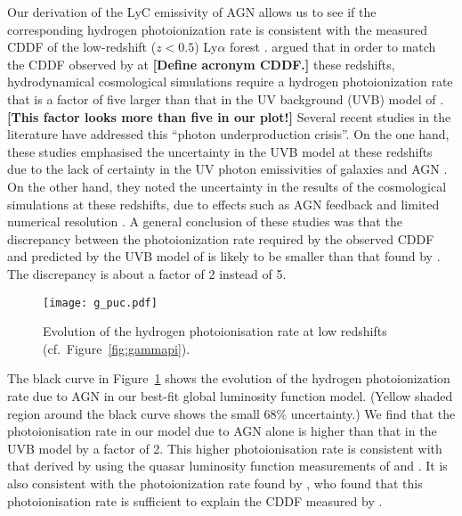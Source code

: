 \documentclass[a4paper,fleqn,usenatbib]{mnras}
\newcommand{\gk}[1]{{\bf \color{notecolor} [#1]}}
\begin{document}
Our derivation of the LyC emissivity of AGN allows us to see if the
corresponding hydrogen photoionization rate is consistent with the
measured CDDF of the low-redshift ($z<0.5$) Ly$\alpha$ forest
\citep{2016ApJ...817..111D}.  \citet{2014ApJ...789L..32K} argued that
in order to match the CDDF observed by \citet{2016ApJ...817..111D} at
\gk{Define acronym CDDF.}  these redshifts, hydrodynamical
cosmological simulations require a hydrogen photoionization rate that
is a factor of five larger than that in the UV background (UVB) model
of \citet{2012ApJ...746..125H}.  \gk{This factor looks more than five
  in our plot!}  Several recent studies in the literature have
addressed this ``photon underproduction crisis''.  On the one hand,
these studies emphasised the uncertainty in the
\citet{2012ApJ...746..125H} UVB model at these redshifts due to the
lack of certainty in the UV photon emissivities of galaxies and AGN
\citep{2015MNRAS.451L..30K, 2015ApJ...811....3S}.  On the other hand,
they noted the uncertainty in the results of the cosmological
simulations at these redshifts, due to effects such as AGN feedback
and limited numerical resolution \citep{2015ApJ...811....3S,
  2017MNRAS.467L..86V, 2017MNRAS.471.1056N, 2017ApJ...837..106O,
  2017MNRAS.466..838G, 2017MNRAS.467.3172G, 2017ApJ...835..175G}.  A
general conclusion of these studies was that the discrepancy between
the photoionization rate required by the observed CDDF and predicted
by the UVB model of \citet{2012ApJ...746..125H} is likely to be
smaller than that found by \citet{2014ApJ...789L..32K}.  The
discrepancy is about a factor of 2 instead of 5.

\begin{figure}
  \begin{center}
    \texttt{[image: g\_puc.pdf]}
  \end{center}
  \caption{Evolution of the hydrogen photoionisation rate at low
    redshifts (cf.\ Figure~\ref{fig:gammapi}).\label{fig:puc}}
\end{figure}

The black curve in Figure~\ref{fig:puc} shows the evolution of the
hydrogen photoionization rate due to AGN in our best-fit global
luminosity function model.  (Yellow shaded region around the black
curve shows the small 68\% uncertainty.)  We find that the
photoionisation rate in our model due to AGN alone is higher than that
in the \citet{2012ApJ...746..125H} UVB model by a factor of 2.  This
higher photoionisation rate is consistent with that derived by
\citet{2015MNRAS.451L..30K} using the quasar luminosity function
measurements of \citet{2009MNRAS.392...19C} and
\citet{2013A&A...551A..29P}.  It is also consistent with the
photoionization rate found by \citet{2017MNRAS.467.3172G}, who found
that this photoionisation rate is sufficient to explain the CDDF
measured by \citet{2016ApJ...817..111D}.
\end{document}
